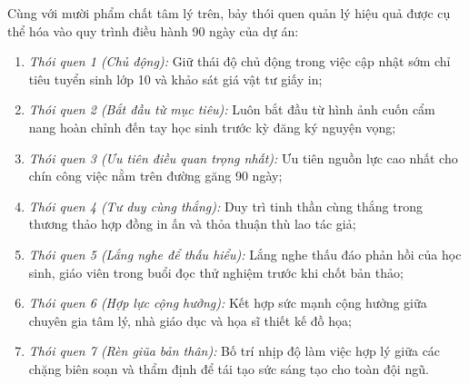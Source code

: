 Cùng với mười phẩm chất tâm lý trên, bảy thói quen quản lý hiệu quả được cụ thể hóa vào quy trình điều hành 90 ngày của dự án:
\begin{enumerate}
    \item \textit{Thói quen 1 (Chủ động):} Giữ thái độ chủ động trong việc cập nhật sớm chỉ tiêu tuyển sinh lớp 10 và khảo sát giá vật tư giấy in;
    \item \textit{Thói quen 2 (Bắt đầu từ mục tiêu):} Luôn bắt đầu từ hình ảnh cuốn cẩm nang hoàn chỉnh đến tay học sinh trước kỳ đăng ký nguyện vọng;
    \item \textit{Thói quen 3 (Ưu tiên điều quan trọng nhất):} Ưu tiên nguồn lực cao nhất cho chín công việc nằm trên đường găng 90 ngày;
    \item \textit{Thói quen 4 (Tư duy cùng thắng):} Duy trì tinh thần cùng thắng trong thương thảo hợp đồng in ấn và thỏa thuận thù lao tác giả;
    \item \textit{Thói quen 5 (Lắng nghe để thấu hiểu):} Lắng nghe thấu đáo phản hồi của học sinh, giáo viên trong buổi đọc thử nghiệm trước khi chốt bản thảo;
    \item \textit{Thói quen 6 (Hợp lực cộng hưởng):} Kết hợp sức mạnh cộng hưởng giữa chuyên gia tâm lý, nhà giáo dục và họa sĩ thiết kế đồ họa;
    \item \textit{Thói quen 7 (Rèn giũa bản thân):} Bố trí nhịp độ làm việc hợp lý giữa các chặng biên soạn và thẩm định để tái tạo sức sáng tạo cho toàn đội ngũ.
\end{enumerate}

